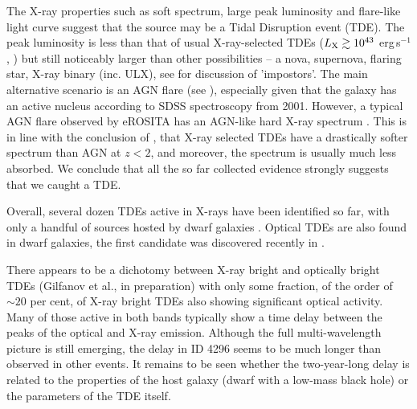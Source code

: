 \documentclass[fleqn,usenatbib]{mnras}
\newcommand{\ergps}{erg\,s$^{-1}$}
\newcommand{\mg}[1]{\textcolor{blue}{{MG: \bf||#1||}}}
\begin{document}
The X-ray properties such as soft spectrum, large peak luminosity and flare-like light curve suggest that the source may be a Tidal Disruption event (TDE). 
The peak luminosity  is less than that of usual X-ray-selected TDEs ($L_{\rm X}\gtrsim10^{43}$ \ergps,  \citealt{Saxton2020, Sazonov2021}) but still noticeably larger than   other possibilities -- a nova, supernova, flaring star, X-ray binary (inc. ULX), see \citet{Zabludoff2021} for discussion of 'impostors'. The main alternative scenario is an AGN flare (see \citealt{Saxton2012, Auchettl2018, Neustadt2020, vanVelzen2021, vanVelzen2021b, Zabludoff2021}), especially given that the galaxy has an active nucleus according to SDSS spectroscopy from 2001. However, a typical AGN flare observed by eROSITA has an AGN-like hard X-ray spectrum \citep{Medvedev2022}. This is in line with the conclusion of  \citealt{Auchettl2018}, that X-ray selected TDEs have a drastically softer spectrum than  AGN at $z<2$, and moreover, the spectrum is usually much less absorbed. 
We conclude that  all the so far collected evidence strongly suggests that we caught a TDE. 


Overall, several dozen TDEs active in X-rays have been identified so far, with only a handful of sources hosted by dwarf galaxies \citep{Maksym2013, Donato2014, Maksym2014,  Lin2017, He2021}. Optical TDEs are also found in dwarf galaxies, the first candidate was discovered recently in \citealt{Angus2022}. 


There appears to be a dichotomy between X-ray bright and optically bright TDEs (Gilfanov et al., in preparation) with only some fraction, of the order of $\sim 20$ per cent, of X-ray bright TDEs also showing significant optical activity. Many of those active in both bands typically show a time delay between the peaks of the optical and X-ray emission. Although the full multi-wavelength picture is still emerging, the delay in ID 4296 seems to be much longer than observed in other events. 
It remains to be seen whether  the two-year-long delay is related to the properties of the host galaxy (dwarf with a low-mass black hole) or the parameters of the TDE itself.


\end{document}

